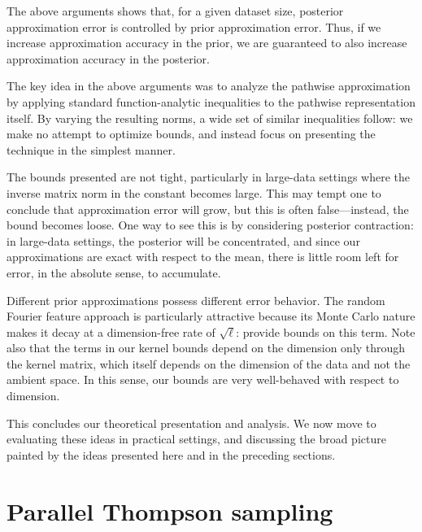 \documentclass[11pt]{book}
\begin{document}
The above arguments shows that, for a given dataset size, posterior approximation error is controlled by prior approximation error.
Thus, if we increase approximation accuracy in the prior, we are guaranteed to also increase approximation accuracy in the posterior.

The key idea in the above arguments was to analyze the pathwise approximation by applying standard function-analytic inequalities to the pathwise representation itself.
By varying the resulting norms, a wide set of similar inequalities follow: we make no attempt to optimize bounds, and instead focus on presenting the technique in the simplest manner.

The bounds presented are not tight, particularly in large-data settings where the inverse matrix norm in the constant becomes large.
This may tempt one to conclude that approximation error will grow, but this is often false---instead, the bound becomes loose.
One way to see this is by considering posterior contraction: in large-data settings, the posterior will be concentrated, and since our approximations are exact with respect to the mean, there is little room left for error, in the absolute sense, to accumulate.

Different prior approximations possess different error behavior.
The random Fourier feature approach is particularly attractive because its Monte Carlo nature makes it decay at a dimension-free rate of $\sqrt{\ell}$: \textcite{sutherland15} provide bounds on this term.
Note also that the terms in our kernel bounds depend on the dimension only through the kernel matrix, which itself depends on the dimension of the data and not the ambient space.
In this sense, our bounds are very well-behaved with respect to dimension.

This concludes our theoretical presentation and analysis.
We now move to evaluating these ideas in practical settings, and discussing the broad picture painted by the ideas presented here and in the preceding sections.

\section{Parallel Thompson sampling}
\end{document}
